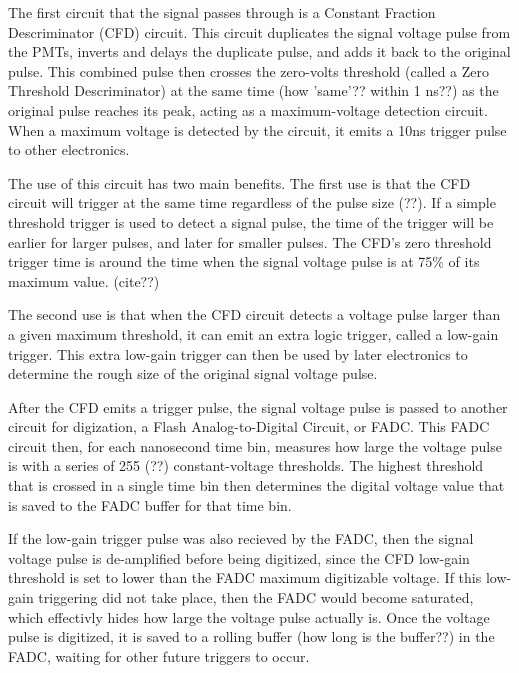 The first circuit that the signal passes through is a Constant Fraction Descriminator (CFD) circuit.
This circuit duplicates the signal voltage pulse from the PMTs, inverts and delays the duplicate pulse, and adds it back to the original pulse.
This combined pulse then crosses the zero-volts threshold (called a Zero Threshold Descriminator) at the same time (how 'same'?? within 1 ns??) as the original pulse reaches its peak, acting as a maximum-voltage detection circuit.
When a maximum voltage is detected by the circuit, it emits a 10ns trigger pulse to other electronics.

The use of this circuit has two main benefits.
The first use is that the CFD circuit will trigger at the same time regardless of the pulse size (??).
If a simple threshold trigger is used to detect a signal pulse, the time of the trigger will be earlier for larger pulses, and later for smaller pulses.
The CFD's zero threshold trigger time is around the time when the signal voltage pulse is at 75\% of its maximum value. (cite??)

The second use is that when the CFD circuit detects a voltage pulse larger than a given maximum threshold, it can emit an extra logic trigger, called a low-gain trigger.
This extra low-gain trigger can then be used by later electronics to determine the rough size of the original signal voltage pulse.




After the CFD emits a trigger pulse, the signal voltage pulse is passed to another circuit for digization, a Flash Analog-to-Digital Circuit, or FADC.
This FADC circuit then, for each nanosecond time bin, measures how large the voltage pulse is with a series of 255 (??) constant-voltage thresholds.
The highest threshold that is crossed in a single time bin then determines the digital voltage value that is saved to the FADC buffer for that time bin.

If the low-gain trigger pulse was also recieved by the FADC, then the signal voltage pulse is de-amplified before being digitized, since the CFD low-gain threshold is set to lower than the FADC maximum digitizable voltage.
If this low-gain triggering did not take place, then the FADC would become saturated, which effectivly hides how large the voltage pulse actually is.
Once the voltage pulse is digitized, it is saved to a rolling buffer (how long is the buffer??) in the FADC, waiting for other future triggers to occur.

